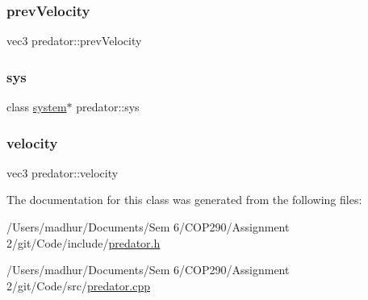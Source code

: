 \mbox{\label{classpredator_a5e1ec6c8df7baefd2578738ff18346cc}} 
\subsubsection{\texorpdfstring{prev\+Velocity}{prevVelocity}}
{\footnotesize\ttfamily vec3 predator\+::prev\+Velocity\hspace{0.3cm}{\ttfamily [private]}}

\mbox{\label{classpredator_a46029432880eb6c8b11edd70cc1468a2}} 
\subsubsection{\texorpdfstring{sys}{sys}}
{\footnotesize\ttfamily class \mbox{\hyperlink{classsystem}{system}}$\ast$ predator\+::sys\hspace{0.3cm}{\ttfamily [private]}}

\mbox{\label{classpredator_aa515213888cc078cc3cc4d499d310f4f}} 
\subsubsection{\texorpdfstring{velocity}{velocity}}
{\footnotesize\ttfamily vec3 predator\+::velocity\hspace{0.3cm}{\ttfamily [private]}}



The documentation for this class was generated from the following files\+:\begin{DoxyCompactItemize}
\item 
/\+Users/madhur/\+Documents/\+Sem 6/\+C\+O\+P290/\+Assignment 2/git/\+Code/include/\mbox{\hyperlink{predator_8h}{predator.\+h}}\item 
/\+Users/madhur/\+Documents/\+Sem 6/\+C\+O\+P290/\+Assignment 2/git/\+Code/src/\mbox{\hyperlink{predator_8cpp}{predator.\+cpp}}\end{DoxyCompactItemize}
